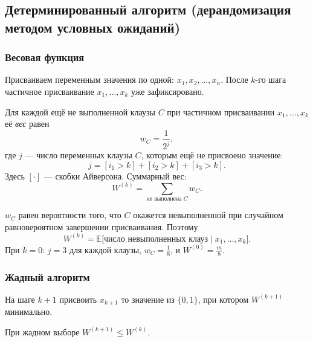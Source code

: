 \subsection{Детерминированный алгоритм (дерандомизация методом условных ожиданий)}

\subsubsection*{Весовая функция}

Присваиваем переменным значения по одной: $x_1, x_2, \ldots, x_n$. После $k$-го шага частичное присваивание $x_1, \ldots, x_k$ уже зафиксировано.

\begin{Definition}{}{}
	Для каждой ещё не выполненной клаузы $C$ при частичном присваивании $x_1, \ldots, x_k$ её \emph{вес} равен
	\[
	w_C = \frac{1}{2^j},
	\]
	где $j$ --- число переменных клаузы $C$, которым ещё не присвоено значение:
	\[
	j = [i_1 > k] + [i_2 > k] + [i_3 > k].
	\]
	Здесь $[\cdot]$ --- скобки Айверсона. Суммарный вес:
	\[
	W^{(k)} = \sum_{\text{не выполнена } C} w_C.
	\]
\end{Definition}

\begin{Remark}{}{}
	$w_C$ равен вероятности того, что $C$ окажется невыполненной при случайном равновероятном завершении присваивания. Поэтому
	\[
	W^{(k)} = \mathbb{E}\bigl[\text{число невыполненных клауз} \mid x_1,\ldots,x_k\bigr].
	\]
	При $k = 0$: $j = 3$ для каждой клаузы, $w_C = \tfrac{1}{8}$, и $W^{(0)} = \tfrac{m}{8}$.
\end{Remark}

\subsubsection*{Жадный алгоритм}

На шаге $k+1$ присвоить $x_{k+1}$ то значение из $\{0,1\}$, при котором $W^{(k+1)}$ минимально.

\begin{Statement}{}{}
	При жадном выборе $W^{(k+1)} \leq W^{(k)}$.
\end{Statement}

